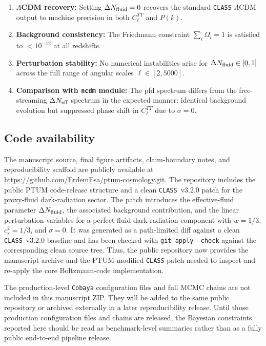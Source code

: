 \documentclass[epj]{svjour}
\begin{document}
\begin{enumerate}
\item \textbf{$\Lambda$CDM recovery:} Setting
      $\Delta N_{\rm fluid}=0$ recovers the standard \texttt{CLASS}
      $\Lambda$CDM output to machine precision in both
      $C_\ell^{TT}$ and $P(k)$.

\item \textbf{Background consistency:} The Friedmann constraint
      $\sum_i\Omega_i=1$ is satisfied to $<10^{-12}$ at all
      redshifts.

\item \textbf{Perturbation stability:} No numerical instabilities
      arise for $\Delta N_{\rm fluid}\in[0,1]$ across the full
      range of angular scales $\ell\in[2,5000]$.

\item \textbf{Comparison with \texttt{ncdm} module:} The pfd
      spectrum differs from the free-streaming
      $\Delta N_{\rm eff}$ spectrum in the expected manner:
      identical background evolution but suppressed phase shift
      in $C_\ell^{TT}$ due to $\sigma=0$.
\end{enumerate}

\subsection{Code availability}
\label{app:code-availability}

The manuscript source, final figure artifacts, claim-boundary notes,
and reproducibility scaffold are publicly available at
\url{https://github.com/ErdemEsa/ptum-cosmology.git}. The repository
includes the public PTUM code-release structure and a clean
\texttt{CLASS}~v3.2.0 patch for the proxy-fluid dark-radiation sector.
The patch introduces the effective-fluid parameter
$\Delta N_{\rm fluid}$, the associated background contribution, and the
linear perturbation variables for a perfect-fluid dark-radiation
component with $w=1/3$, $c_s^2=1/3$, and $\sigma=0$. It was generated as
a path-limited diff against a clean \texttt{CLASS}~v3.2.0 baseline and
has been checked with \texttt{git apply --check} against the corresponding
clean source tree. Thus, the public repository now provides the
manuscript archive and the PTUM-modified \texttt{CLASS} patch needed to
inspect and re-apply the core Boltzmann-code implementation.

The production-level \texttt{Cobaya} configuration files and full MCMC
chains are not included in this manuscript ZIP. They will be added to the
same public repository or archived externally in a later reproducibility
release. Until those production configuration files and chains are
released, the Bayesian constraints reported here should be read as
benchmark-level summaries rather than as a fully public end-to-end
pipeline release.
\end{document}

